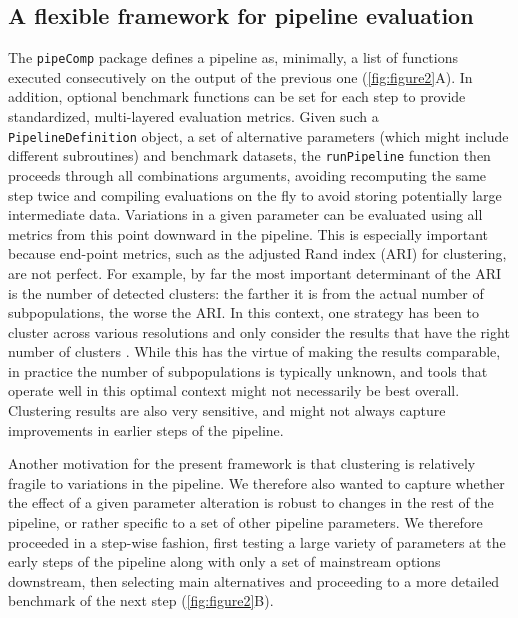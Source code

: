 \documentclass{bmcart}
\begin{document}
\subsection*{A flexible framework for pipeline evaluation}

The \texttt{pipeComp} package defines a pipeline as, minimally, a list of functions executed consecutively on the output of the previous one (\ref{fig:figure2}A). In addition, optional benchmark functions can be set for each step to provide standardized, multi-layered evaluation metrics. Given such a \texttt{PipelineDefinition} object, a set of alternative parameters (which might include different subroutines) and benchmark datasets, the \texttt{runPipeline} function then proceeds through all combinations arguments, avoiding recomputing the same step twice and compiling evaluations on the fly to avoid storing potentially large intermediate data. Variations in a given parameter can be evaluated using all metrics from this point downward in the pipeline. This is especially important because end-point metrics, such as the adjusted Rand index (ARI) for clustering, are not perfect. For example, by far the most important determinant of the ARI is the number of detected clusters: the farther it is from the actual number of subpopulations, the worse the ARI. In this context, one strategy has been to cluster across various resolutions and only consider the results that have the right number of clusters \citep{duoClustering2018}. While this has the virtue of making the results comparable, in practice the number of subpopulations is typically unknown, and tools that operate well in this optimal context might not necessarily be best overall. Clustering results are also very sensitive, and might not always capture improvements in earlier steps of the pipeline.

Another motivation for the present framework is that clustering is relatively fragile to variations in the pipeline. We therefore also wanted to capture whether the effect of a given parameter alteration is robust to changes in the rest of the pipeline, or rather specific to a set of other pipeline parameters. We therefore proceeded in a step-wise fashion, first testing a large variety of parameters at the early steps of the pipeline along with only a set of mainstream options downstream, then selecting main alternatives and proceeding to a more detailed benchmark of the next step (\ref{fig:figure2}B).
\end{document}
